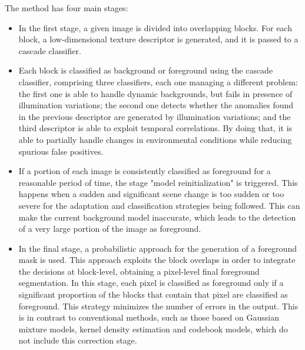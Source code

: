 \begin{itemize}
The method has four main stages:
\begin{itemize}
 \item In the first stage, a given image is divided into overlapping blocks. For each block, a low-dimensional texture descriptor is generated, and it is passed to a cascade classifier.
 \item Each block is classified as background or foreground using the cascade classifier, comprising three 
classifiers, each one managing a different problem: the first one is able to handle dynamic backgrounds, but 
fails in presence of illumination variations; the second one detects whether the anomalies found in the previous 
descriptor are generated by illumination variations; and the third descriptor is able to exploit temporal correlations. 
By doing that, it is able to partially handle changes in environmental conditions while reducing spurious false 
positives.
 \item If a portion of each image is consistently classified as foreground for a reasonable period of time, the 
stage "model reinitialization" is triggered. This happens when a sudden and significant scene change is too sudden or 
too severe for the adaptation and classification strategies being followed. This can make the current background model 
inaccurate, which leads to the detection of a very large portion of the image as foreground.
 \item In the final stage, a probabilistic approach for the generation of a foreground mask is used. This approach 
exploits the block overlaps in order to integrate the decisions at block-level, obtaining a pixel-level final 
foreground segmentation. In this stage, each pixel is classified as foreground only if a significant proportion of the 
blocks that contain that pixel are classified as foreground. This strategy minimizes the number of errors in the 
output. This is in contrast to conventional methods, such as those based on Gaussian mixture models, kernel density 
estimation 
and codebook models, which do not include this correction stage.
\end{itemize}


\end{itemize}
